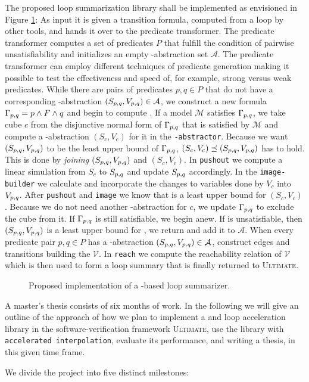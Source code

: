 
The proposed \qvasrs loop summarization library shall be implemented as envisioned in Figure \ref{fig}: As input it is given a transition formula, computed from a loop by other tools, and hands it over to the predicate transformer. The predicate transformer computes a set of predicates $P$ that fulfill the condition of pairwise unsatisfiability and initializes an empty \qvasr-abstraction set $\mathcal{A}$. The predicate transformer can employ different techniques of predicate generation making it possible to test the effectiveness and speed of, for example, strong versus weak predicates. While there are pairs of predicates $p, q \in P$ that do not have a corresponding \qvasr-abstraction $(S_{p, q}, V_{p, q}) \in \mathcal{A}$, we construct a new formula $\Gamma_{p, q} = p \land F \land q$ and begin to compute \pqvasr. If a model $\mathcal{M}$ satisfies $\Gamma_{p, q}$, we take cube $c$ from the disjunctive normal form of $\Gamma_{p, q}$ that is satisfied by $\mathcal{M}$ and compute a \qvasr-abstraction $(S_c, V_c)$ for it in the \texttt{\qvasr-abstractor}. Because we want $(S_{p, q}, V_{p, q})$ to be the least upper bound of $\Gamma_{p, q}$, $(S_c, V_c) \preceq (S_{p, q}, V_{p, q})$ has to hold. This is done by \textsl{joining} $(S_{p, q}, V_{p, q})$ and $(S_c, V_c)$. In \texttt{pushout} we compute a linear simulation from $S_c$ to $S_{p, q}$ and update $S_{p, q}$ accordingly. In the \texttt{image-builder} we calculate and incorporate the changes to variables done by $V_c$ into $V_{p, q}$. After \texttt{pushout} and \texttt{image} we know that \pqvasr is a least upper bound for $(S_c, V_c)$. Because we do not need another \qvasr-abstraction for $c$, we update $\Gamma_{p, q}$ to exclude the cube from it. If $\Gamma_{p, q}$ is still satisfiable, we begin anew.
If \pqformula is unsatisfiable, then $(S_{p, q}, V_{p, q})$ is a least upper bound for \pqformula, we return and add it to $\mathcal{A}$. When every predicate pair $p, q \in P$ has a \qvasr-abstraction $(S_{p, q}, V_{p, q}) \in \mathcal{A}$, construct edges and transitions building the \qvasrs $\mathcal{V}$. In \texttt{reach} we compute the reachability relation of $\mathcal{V}$ which is then used to form a loop summary that is finally returned to \textsc{Ultimate}.
\begin{figure}[H]
    
    \caption{Proposed implementation of a \qvasrs-based loop summarizer.}
    \label{fig}
\end{figure}

A master's thesis consists of six months of work. In the following we will give an outline of the approach of how we plan to implement a \qvasr and \qvasrs loop acceleration library in the software-verification framework \textsc{Ultimate}, use the library with \texttt{accelerated interpolation}, evaluate its performance, and writing a thesis, in this given time frame. \\ \par
We divide the project into five distinct milestones:

